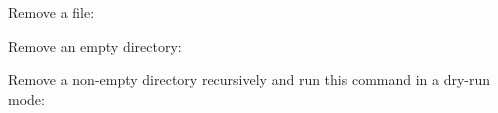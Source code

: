 \begin{flushleft}
	Remove a file:
\end{flushleft}

\begin{flushleft}
\end{flushleft}

\begin{flushleft}
	Remove an empty directory:
\end{flushleft}

\begin{flushleft}
\end{flushleft}

\begin{flushleft}
	Remove a non-empty directory recursively and run this command in a dry-run mode:
\end{flushleft}

\begin{flushleft}
\end{flushleft}
